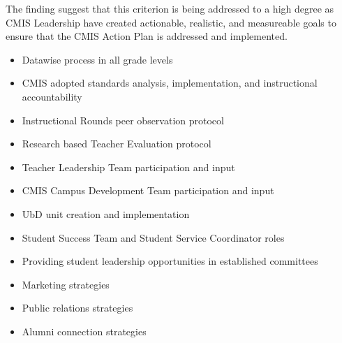\begin{findings}
The finding suggest that this criterion is being addressed to a high degree as CMIS Leadership have created actionable, realistic, and measureable goals to ensure that the CMIS Action Plan is addressed and implemented. 

\begin{itemize}
\item Datawise process in all grade levels
\item CMIS adopted standards analysis, implementation, and instructional accountability
\item Instructional Rounds peer observation protocol 
\item Research based Teacher Evaluation protocol 
\item Teacher Leadership Team participation and input 
\item CMIS Campus Development Team participation and input
\item UbD unit creation and implementation
\item Student Success Team and Student Service Coordinator roles
\end{itemize}
 

\begin{itemize}
\item Providing student leadership opportunities in established committees
\item Marketing strategies
\item Public relations strategies 
\item Alumni connection strategies
\end{itemize}
 
\end{findings}

